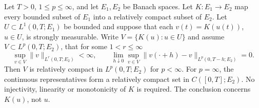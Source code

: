 Let $T>0$, $1\le p\le\infty$, and let $E_1,E_2$ be Banach spaces.
Let $K:E_1\to E_2$ map every bounded subset of $E_1$ into a relatively compact subset of $E_2$.
Let $U\subset L^1(0,T;E_1)$ be bounded and suppose that each $v(t)=K(u(t))$, $u\in U$, is strongly measurable.
Write $V=\{K(u):u\in U\}$ and assume $V\subset L^p(0,T;E_2)$, that for some $1<r\le\infty$
\[
\sup_{v\in V}\|v\|_{L^r(0,T;E_2)}<\infty,
\qquad
\lim_{h\downarrow0}\sup_{v\in V}\|v(\cdot+h)-v\|_{L^p(0,T-h;E_2)}=0.
\]
Then $V$ is relatively compact in $L^p(0,T;E_2)$ for $p<\infty$.
For $p=\infty$, the continuous representatives form a relatively compact set in $C([0,T];E_2)$.
No injectivity, linearity or monotonicity of $K$ is required. The conclusion concerns $K(u)$, not $u$.